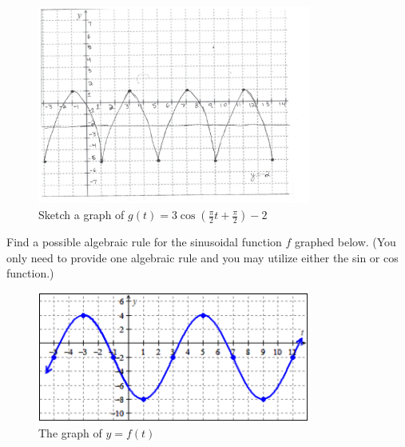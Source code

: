\begin{solution}
  \begin{figure}[htpb]
    \centering
    \includegraphics[width=0.8\textwidth]{images/midterm-a.png}
    \caption{Sketch a graph of $g(t) = 3\cos (\frac{\pi}{2}t + \frac{\pi}{2}) - 2$}
    \label{fig:graph_of_equation}
  \end{figure}
\end{solution}

\newpage

\begin{problem}
  Find a possible algebraic rule for the sinusoidal function $f$ graphed below.
  (You only need to provide one algebraic rule and you may utilize either the
  sin or cos function.)

  \begin{figure}[htpb]
    \centering
    \includegraphics[width=0.8\textwidth]{images/midterm-b.png}
    \caption{The graph of $y = f(t)$}
    \label{fig:graph_of_equation}
  \end{figure}
\end{problem}

